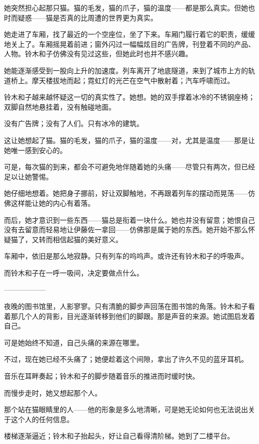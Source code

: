 她突然担心起那只猫。猫的毛发，猫的爪子，猫的温度——都是那么真实。但她也时而疑惑——猫是否真的比周遭的世界更为真实。

她走进了车厢，找了最近的一个空座位，坐了下来。车厢门履行着它的职责，缓缓地关上了。车厢摇晃着前进；窗外闪过一幅幅炫目的广告牌，刊登着不同的产品、人物。铃木和子仿佛没有见过这些，但她此时也并不感兴趣。

她能逐渐感受到一股向上升的加速度。列车离开了地底隧道，来到了城市上方的轨道桥上。摩天楼拔地而起；霓虹灯的光芒在空气中散射着；汽车呼啸而过。

铃木和子越来越怀疑这一切的真实性了。她想。她的双手撑着冰冷的不锈钢座椅；双脚自然地悬挂着，没有触碰地面。

没有广告牌；没有了人们。只有冰冷的建筑。

这让她想起了猫。猫的毛发，猫的爪子，猫的温度——对，尤其是温度——那是让她唯一感到安心的。

可是，每次猫的到来，都会不可避免地伴随着她的头痛——尽管只有两次，但已经足以让她警惕。

她仔细地想着。她把身子挪前，好让双脚触地，不再跟着列车的摆动而晃荡——仿佛这样能让她的内心有着落。

而后，她才意识到一些东西——猫总是衔着一块什么。她也并没有留意；她恨自己没有去留意而轻易地让伊藤佐一拿回——仿佛那是属于她的东西。她开始不那么怀疑猫了，又转而相信起猫的美好意义。

车厢中，依旧是那么地寂静。只有列车的呜呜声。或许还有铃木和子的呼吸声。

而铃木和子在一呼一吸间，决定要做点什么。

\begin{center}
——————
\end{center}

夜晚的图书馆里，人影寥寥。只有清脆的脚步声回荡在图书馆的角落。铃木和子看着那几个人的背影，目光逐渐转移到他们的脚跟。那是声音的来源。她试图启发着自己。

可是她始终不知道，自己头痛的来源在哪里。

不过，现在她已经不头痛了；她便趁着这个间隙，拿出了许久不见的蓝牙耳机。

音乐在耳畔奏起；铃木和子的脚步随着音乐的推进而时缓时快。

而慢步走时，她又想起那个人。

那个站在猫眼睛里的人——他的形象是多么地清晰，可是她无论如何也无法说出关于这个人的任何信息。


楼梯逐渐逼近；铃木和子抬起头，好让自己看得清阶梯。她到了二楼平台。

